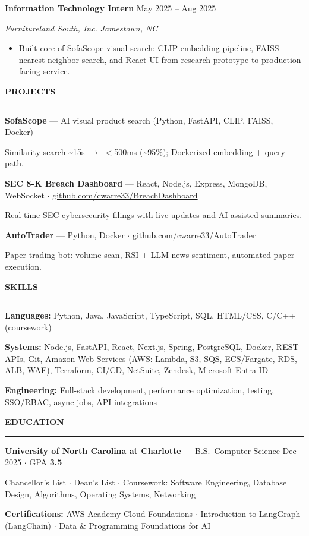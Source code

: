 \documentclass[10pt,letterpaper]{article}
\newcommand{\rsection}[1]{%
  \vspace{5pt}%
  {\normalsize\bfseries\uppercase{#1}}\par\vspace{-0.55em}
  {\color{rulec}\rule{\textwidth}{0.4pt}}\par\vspace{3pt}%
}
\newcommand{\role}[4]{%
  {\bfseries #1} \hfill {\small #4}\par
  {\small\textit{#2}} \hfill {\small\textit{#3}}\par\vspace{1.5pt}%
}
\begin{document}
\vspace{3pt}
\role{Information Technology Intern}{Furnitureland South, Inc.}{Jamestown, NC}{May 2025 -- Aug 2025}
\begin{itemize}
  \item Built core of SofaScope visual search: CLIP embedding pipeline, FAISS nearest-neighbor search, and React UI from research prototype to production-facing service.
\end{itemize}

\rsection{Projects}
{\bfseries SofaScope} --- AI visual product search (Python, FastAPI, CLIP, FAISS, Docker)\par
{\small Similarity search {\textasciitilde}15s $\rightarrow$ $<$500ms ({\textasciitilde}95\%); Dockerized embedding + query path.}

\vspace{3pt}
{\bfseries SEC 8-K Breach Dashboard} --- React, Node.js, Express, MongoDB, WebSocket \;$\cdot$\; \href{https://github.com/cwarre33/BreachDashboard}{github.com/cwarre33/BreachDashboard}\par
{\small Real-time SEC cybersecurity filings with live updates and AI-assisted summaries.}

\vspace{3pt}
{\bfseries AutoTrader} --- Python, Docker \;$\cdot$\; \href{https://github.com/cwarre33/AutoTrader}{github.com/cwarre33/AutoTrader}\par
{\small Paper-trading bot: volume scan, RSI + LLM news sentiment, automated paper execution.}

\rsection{Skills}
{\bfseries Languages:} Python, Java, JavaScript, TypeScript, SQL, HTML/CSS, C/C++ (coursework)\par
{\bfseries Systems:} Node.js, FastAPI, React, Next.js, Spring, PostgreSQL, Docker, REST APIs, Git, Amazon Web Services (AWS: Lambda, S3, SQS, ECS/Fargate, RDS, ALB, WAF), Terraform, CI/CD, NetSuite, Zendesk, Microsoft Entra ID\par
{\bfseries Engineering:} Full-stack development, performance optimization, testing, SSO/RBAC, async jobs, API integrations\par

\rsection{Education}
{\bfseries University of North Carolina at Charlotte} --- B.S.\ Computer Science \hfill Dec 2025 \;$\cdot$\; GPA {\bfseries 3.5}\par
{\small Chancellor's List \;$\cdot$\; Dean's List \;$\cdot$\; Coursework: Software Engineering, Database Design, Algorithms, Operating Systems, Networking}\par
\vspace{2pt}
{\small\bfseries Certifications:} AWS Academy Cloud Foundations \;$\cdot$\; Introduction to LangGraph (LangChain) \;$\cdot$\; Data \& Programming Foundations for AI
\end{document}
